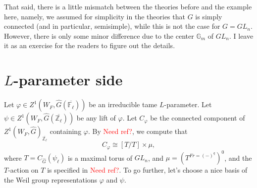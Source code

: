\documentclass{article}
\newcommand{\red}[1]{\textcolor{red}{#1}}
\begin{document}
That said, there is a little mismatch between the theories before and the example here, namely, we assumed for simplicity in the theories that $G$ is simply connected (and in particular, semisimple), while this is not the case for $G=GL_n$. However, there is only some minor difference due to the center $\mathbb{G}_m$ of $GL_n$. I leave it as an exercise for the readers to figure out the details.

\section{$L$-parameter side}
Let $\varphi \in Z^1(W_F, \hat{G}(\overline{\mathbb{F}_{\ell}}))$ be an irreducible tame $L$-parameter. Let $\psi \in Z^1(W_F, \hat{G}(\overline{\mathbb{Z}_{\ell}}))$ be any lift of $\varphi$. Let $C_{\varphi}$ be the connected component of $Z^1(W_F, \hat{G})_{\overline{\mathbb{Z}_{\ell}}}$ containing $\varphi$. By \red{Need ref?}, we compute that
$$C_{\varphi} \cong [T/T] \times \mu,$$
where $T=C_{\hat{G}}(\psi_{\ell})$ is a maximal torus of $GL_n$, and $\mu=(T^{Fr=(-)^q})^0$, and the $T$-action on $T$ is specified in \red{Need ref?}. To go further, let's choose a nice basis of the Weil group representations $\varphi$ and $\psi$.
\end{document}
